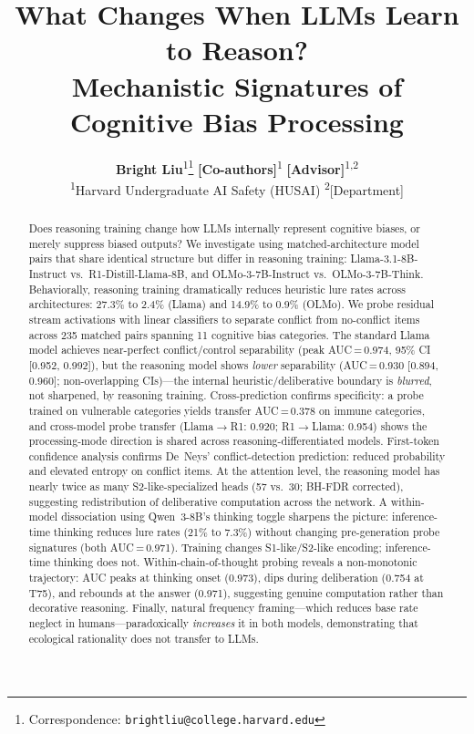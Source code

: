 \documentclass[accepted]{article}
\title{What Changes When LLMs Learn to Reason?\\
  Mechanistic Signatures of Cognitive Bias Processing}
\author{%
  \textbf{Bright Liu}\textsuperscript{1}\thanks{Correspondence: \texttt{brightliu@college.harvard.edu}} \quad
  \textbf{[Co-authors]}\textsuperscript{1} \quad
  \textbf{[Advisor]}\textsuperscript{1,2} \\[6pt]
  \textsuperscript{1}Harvard Undergraduate AI Safety (HUSAI) \quad
  \textsuperscript{2}[Department] \\
}
\date{}
\newcommand{\sone}{S1-like}
\newcommand{\stwo}{S2-like}
\begin{document}
\maketitle


\begin{abstract}
Does reasoning training change how LLMs internally represent cognitive
biases, or merely suppress biased outputs?  We investigate using
matched-architecture model pairs that share identical structure but
differ in reasoning training:
Llama-3.1-8B-Instruct vs.\ R1-Distill-Llama-8B, and
OLMo-3-7B-Instruct vs.\ OLMo-3-7B-Think.  Behaviorally, reasoning
training dramatically reduces heuristic lure rates across architectures:
27.3\% to 2.4\% (Llama) and 14.9\% to 0.9\% (OLMo).  We probe
residual stream activations with linear classifiers to separate conflict
from no-conflict items across 235 matched pairs spanning 11 cognitive
bias categories.  The standard Llama model achieves near-perfect
conflict/control separability (peak AUC\,=\,0.974, 95\% CI [0.952,
0.992]), but the reasoning model shows \emph{lower} separability
(AUC\,=\,0.930 [0.894, 0.960]; non-overlapping CIs)---the internal
heuristic/deliberative boundary is \emph{blurred}, not sharpened, by
reasoning training.  Cross-prediction confirms specificity: a probe
trained on vulnerable categories yields transfer AUC\,=\,0.378 on
immune categories, and cross-model probe transfer (Llama$\to$R1:
0.920; R1$\to$Llama: 0.954) shows the processing-mode direction is
shared across reasoning-differentiated models.  First-token confidence
analysis confirms De~Neys' conflict-detection prediction: reduced
probability and elevated entropy on conflict items.  At the attention
level, the reasoning model has nearly twice as many \stwo{}-specialized
heads (57 vs.\ 30; BH-FDR corrected), suggesting redistribution of
deliberative computation across the network.  A within-model
dissociation using Qwen~3-8B's thinking toggle
sharpens the picture: inference-time thinking reduces lure rates (21\%
to 7.3\%) without changing pre-generation probe signatures (both
AUC\,=\,0.971).  Training changes \sone{}/\stwo{} encoding;
inference-time thinking does not.
Within-chain-of-thought probing reveals a non-monotonic trajectory:
AUC peaks at thinking onset (0.973), dips during deliberation
(0.754 at T75), and rebounds at the answer (0.971), suggesting
genuine computation rather than decorative reasoning.
Finally, natural frequency
framing---which reduces base rate neglect in humans---paradoxically
\emph{increases} it in both models, demonstrating that ecological
rationality does not transfer to LLMs.
\end{abstract}
\end{document}
